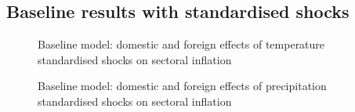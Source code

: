 \documentclass[
  letterpaper,
  DIV=11,
  numbers=noendperiod]{scrartcl}
\begin{document}
\subsection{Baseline results with standardised
shocks}\label{baseline-results-with-standardised-shocks}

\begin{figure}[H]


\caption{\label{fig-baseline_temp_std}Baseline model: domestic and
foreign effects of temperature standardised shocks on sectoral
inflation}

\end{figure}%

\begin{figure}[H]


\caption{\label{fig-baseline_precip_std}Baseline model: domestic and
foreign effects of precipitation standardised shocks on sectoral
inflation}

\end{figure}%
\end{document}

